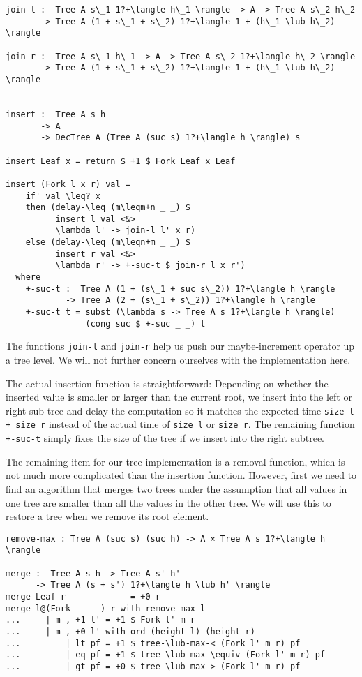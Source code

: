 \begin{lstlisting}[caption={Tree Insertion},label={lst:tree:insert},emph={Tree,Fork,Leaf,insert,join,return,if,then,else}]
join-l :  Tree A s\_1 1?+\langle h\_1 \rangle -> A -> Tree A s\_2 h\_2
       -> Tree A (1 + s\_1 + s\_2) 1?+\langle 1 + (h\_1 \lub h\_2) \rangle

join-r :  Tree A s\_1 h\_1 -> A -> Tree A s\_2 1?+\langle h\_2 \rangle
       -> Tree A (1 + s\_1 + s\_2) 1?+\langle 1 + (h\_1 \lub h\_2) \rangle


insert :  Tree A s h
       -> A
       -> DecTree A (Tree A (suc s) 1?+\langle h \rangle) s

insert Leaf x = return $ +1 $ Fork Leaf x Leaf

insert (Fork l x r) val =
    if' val \leq? x
    then (delay-\leq (m\leqm+n _ _) $
          insert l val <&>
          \lambda l' -> join-l l' x r)
    else (delay-\leq (m\leqn+m _ _) $
          insert r val <&>
          \lambda r' -> +-suc-t $ join-r l x r')
  where
    +-suc-t :  Tree A (1 + (s\_1 + suc s\_2)) 1?+\langle h \rangle
            -> Tree A (2 + (s\_1 + s\_2)) 1?+\langle h \rangle
    +-suc-t t = subst (\lambda s -> Tree A s 1?+\langle h \rangle)
                (cong suc $ +-suc _ _) t
\end{lstlisting}

The functions \texttt{join-l} and \texttt{join-r} help us push our maybe-increment operator up a tree level. We will not further concern ourselves with the implementation here.

The actual insertion function is straightforward: Depending on whether the inserted value is smaller or larger than the current root, we insert into the left or right sub-tree and delay the computation so it matches the expected time \texttt{size l + size r} instead of the actual time of \texttt{size l} or \texttt{size r}. The remaining function \texttt{+-suc-t} simply fixes the size of the tree if we insert into the right subtree.

The remaining item for our tree implementation is a removal function, which is not much more complicated than the insertion function. However, first we need to find an algorithm that merges two trees under the assumption that all values in one tree are smaller than all the values in the other tree. We will use this to restore a tree when we remove its root element.

\begin{lstlisting}[caption={Tree Merge},label={lst:tree:merge},emph={Tree,Fork,Leaf,merge,remove,max}]
remove-max : Tree A (suc s) (suc h) -> A × Tree A s 1?+\langle h \rangle

merge :  Tree A s h -> Tree A s' h'
      -> Tree A (s + s') 1?+\langle h \lub h' \rangle
merge Leaf r             = +0 r
merge l@(Fork _ _ _) r with remove-max l
...     | m , +1 l' = +1 $ Fork l' m r
...     | m , +0 l' with ord (height l) (height r)
...         | lt pf = +1 $ tree-\lub-max-< (Fork l' m r) pf
...         | eq pf = +1 $ tree-\lub-max-\equiv (Fork l' m r) pf
...         | gt pf = +0 $ tree-\lub-max-> (Fork l' m r) pf

\end{lstlisting}

